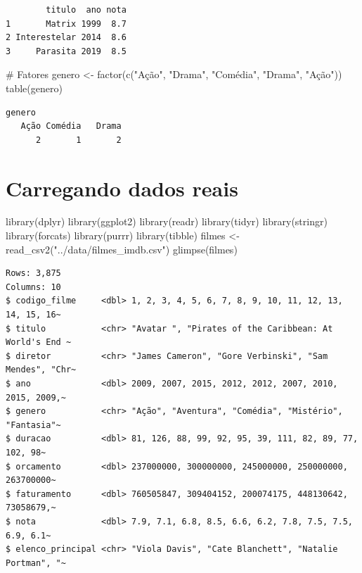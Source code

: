 \documentclass[
  letterpaper,
]{scrbook}
\newenvironment{Shaded}{\begin{snugshade}}{\end{snugshade}}
\newcommand{\CommentTok}[1]{\textcolor[rgb]{0.37,0.37,0.37}{#1}}
\newcommand{\FunctionTok}[1]{\textcolor[rgb]{0.28,0.35,0.67}{#1}}
\newcommand{\NormalTok}[1]{\textcolor[rgb]{0.00,0.23,0.31}{#1}}
\newcommand{\OtherTok}[1]{\textcolor[rgb]{0.00,0.23,0.31}{#1}}
\newcommand{\StringTok}[1]{\textcolor[rgb]{0.13,0.47,0.30}{#1}}
\begin{document}
\begin{verbatim}
        titulo  ano nota
1       Matrix 1999  8.7
2 Interestelar 2014  8.6
3     Parasita 2019  8.5
\end{verbatim}

\begin{Shaded}
\begin{Highlighting}[]
\CommentTok{\# Fatores}
\NormalTok{genero }\OtherTok{\textless{}{-}} \FunctionTok{factor}\NormalTok{(}\FunctionTok{c}\NormalTok{(}\StringTok{"Ação"}\NormalTok{, }\StringTok{"Drama"}\NormalTok{, }\StringTok{"Comédia"}\NormalTok{, }\StringTok{"Drama"}\NormalTok{, }\StringTok{"Ação"}\NormalTok{))}
\FunctionTok{table}\NormalTok{(genero)}
\end{Highlighting}
\end{Shaded}

\begin{verbatim}
genero
   Ação Comédia   Drama 
      2       1       2 
\end{verbatim}

\section*{Carregando dados reais}\label{carregando-dados-reais}


\begin{Shaded}
\begin{Highlighting}[]
\FunctionTok{library}\NormalTok{(dplyr)}
\FunctionTok{library}\NormalTok{(ggplot2)}
\FunctionTok{library}\NormalTok{(readr)}
\FunctionTok{library}\NormalTok{(tidyr)}
\FunctionTok{library}\NormalTok{(stringr)}
\FunctionTok{library}\NormalTok{(forcats)}
\FunctionTok{library}\NormalTok{(purrr)}
\FunctionTok{library}\NormalTok{(tibble)}
\NormalTok{filmes }\OtherTok{\textless{}{-}} \FunctionTok{read\_csv2}\NormalTok{(}\StringTok{"../data/filmes\_imdb.csv"}\NormalTok{)}
\FunctionTok{glimpse}\NormalTok{(filmes)}
\end{Highlighting}
\end{Shaded}

\begin{verbatim}
Rows: 3,875
Columns: 10
$ codigo_filme     <dbl> 1, 2, 3, 4, 5, 6, 7, 8, 9, 10, 11, 12, 13, 14, 15, 16~
$ titulo           <chr> "Avatar ", "Pirates of the Caribbean: At World's End ~
$ diretor          <chr> "James Cameron", "Gore Verbinski", "Sam Mendes", "Chr~
$ ano              <dbl> 2009, 2007, 2015, 2012, 2012, 2007, 2010, 2015, 2009,~
$ genero           <chr> "Ação", "Aventura", "Comédia", "Mistério", "Fantasia"~
$ duracao          <dbl> 81, 126, 88, 99, 92, 95, 39, 111, 82, 89, 77, 102, 98~
$ orcamento        <dbl> 237000000, 300000000, 245000000, 250000000, 263700000~
$ faturamento      <dbl> 760505847, 309404152, 200074175, 448130642, 73058679,~
$ nota             <dbl> 7.9, 7.1, 6.8, 8.5, 6.6, 6.2, 7.8, 7.5, 7.5, 6.9, 6.1~
$ elenco_principal <chr> "Viola Davis", "Cate Blanchett", "Natalie Portman", "~
\end{verbatim}
\end{document}
